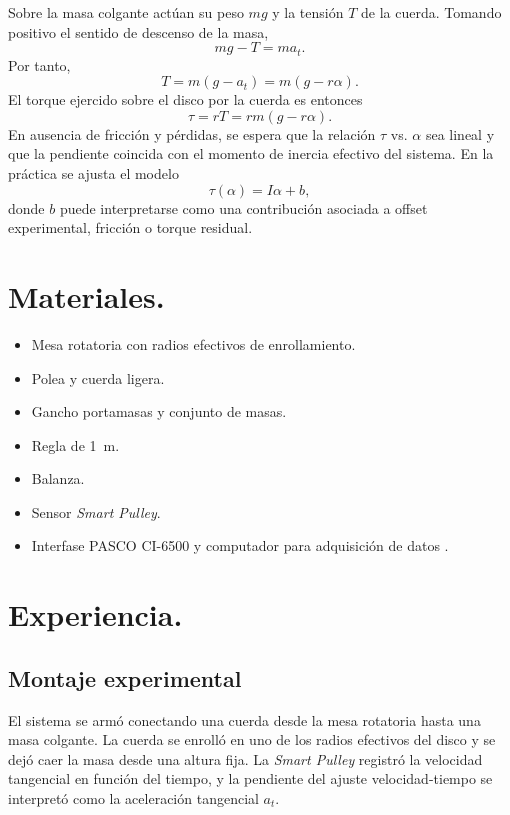 \documentclass[11pt,twocolumn]{article}
\makeatletter
\let\orig@parencite\parencite
\renewcommand{\parencite}[1]{\textcolor{Blue}{\orig@parencite{#1}}}
\renewcommand{\cite}[1]{\parencite{#1}}
\makeatother
\begin{document}
Sobre la masa colgante actúan su peso $mg$ y la tensión $T$ de la cuerda. Tomando positivo el sentido de descenso de la masa,
\begin{equation*}
    mg-T=ma_t.
\end{equation*}
Por tanto,
\begin{equation*}
    T=m(g-a_t)=m(g-r\alpha).
\end{equation*}
El torque ejercido sobre el disco por la cuerda es entonces
\begin{equation*}
    \tau=rT=rm(g-r\alpha).
\end{equation*}
En ausencia de fricción y pérdidas, se espera que la relación $\tau$ vs. $\alpha$ sea lineal y que la pendiente coincida con el momento de inercia efectivo del sistema. En la práctica se ajusta el modelo
\begin{equation*}
    \tau(\alpha)=I\alpha+b,
\end{equation*}
donde $b$ puede interpretarse como una contribución asociada a offset experimental, fricción o torque residual.

\section{Materiales.}

\begin{itemize}
    \item Mesa rotatoria con radios efectivos de enrollamiento.
    \item Polea y cuerda ligera.
    \item Gancho portamasas y conjunto de masas.
    \item Regla de \SI{1}{m}.
    \item Balanza.
    \item Sensor \textit{Smart Pulley}.
    \item Interfase PASCO CI-6500 y computador para adquisición de datos \cite{pasco_smart_pulley}.
\end{itemize}

\section{Experiencia.}

\subsection{Montaje experimental}

El sistema se armó conectando una cuerda desde la mesa rotatoria hasta una masa colgante. La cuerda se enrolló en uno de los radios efectivos del disco y se dejó caer la masa desde una altura fija. La \textit{Smart Pulley} registró la velocidad tangencial en función del tiempo, y la pendiente del ajuste velocidad-tiempo se interpretó como la aceleración tangencial $a_t$.
\end{document}
